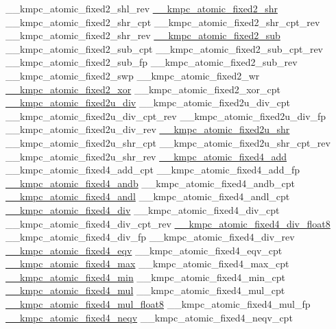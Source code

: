 \begin{DoxyCode}
\_\_kmpc\_atomic\_fixed2\_shl\_rev
\hyperlink{kmp__atomic_8h_a2f1085184a229e72ad013d9c30aa0ce7}{\_\_kmpc\_atomic\_fixed2\_shr}
\_\_kmpc\_atomic\_fixed2\_shr\_cpt
\_\_kmpc\_atomic\_fixed2\_shr\_cpt\_rev
\_\_kmpc\_atomic\_fixed2\_shr\_rev
\hyperlink{kmp__atomic_8h_ac890aceacafc0bc0fd673d5107fe5226}{\_\_kmpc\_atomic\_fixed2\_sub}
\_\_kmpc\_atomic\_fixed2\_sub\_cpt
\_\_kmpc\_atomic\_fixed2\_sub\_cpt\_rev
\_\_kmpc\_atomic\_fixed2\_sub\_fp
\_\_kmpc\_atomic\_fixed2\_sub\_rev
\_\_kmpc\_atomic\_fixed2\_swp
\_\_kmpc\_atomic\_fixed2\_wr
\hyperlink{kmp__atomic_8h_ae5aaefafa4c78317b55ab12e1493ea63}{\_\_kmpc\_atomic\_fixed2\_xor}
\_\_kmpc\_atomic\_fixed2\_xor\_cpt
\hyperlink{kmp__atomic_8h_aee13e51d32f819381cbba00c3b26b607}{\_\_kmpc\_atomic\_fixed2u\_div}
\_\_kmpc\_atomic\_fixed2u\_div\_cpt
\_\_kmpc\_atomic\_fixed2u\_div\_cpt\_rev
\_\_kmpc\_atomic\_fixed2u\_div\_fp
\_\_kmpc\_atomic\_fixed2u\_div\_rev
\hyperlink{kmp__atomic_8h_ad984775f5efdce37aac6fa29c25ae4c1}{\_\_kmpc\_atomic\_fixed2u\_shr}
\_\_kmpc\_atomic\_fixed2u\_shr\_cpt
\_\_kmpc\_atomic\_fixed2u\_shr\_cpt\_rev
\_\_kmpc\_atomic\_fixed2u\_shr\_rev
\hyperlink{kmp__atomic_8h_af3d1bb6747eb9ae36458f5aee2b41d17}{\_\_kmpc\_atomic\_fixed4\_add}
\_\_kmpc\_atomic\_fixed4\_add\_cpt
\_\_kmpc\_atomic\_fixed4\_add\_fp
\hyperlink{kmp__atomic_8h_a2b0ca2e58dd7582202438dd90cae9056}{\_\_kmpc\_atomic\_fixed4\_andb}
\_\_kmpc\_atomic\_fixed4\_andb\_cpt
\hyperlink{kmp__atomic_8h_a14731c60b5778b62db6a852f1ebb2a6a}{\_\_kmpc\_atomic\_fixed4\_andl}
\_\_kmpc\_atomic\_fixed4\_andl\_cpt
\hyperlink{kmp__atomic_8h_aa79d19da90b26da64f6ee2753816c6f7}{\_\_kmpc\_atomic\_fixed4\_div}
\_\_kmpc\_atomic\_fixed4\_div\_cpt
\_\_kmpc\_atomic\_fixed4\_div\_cpt\_rev
\hyperlink{kmp__atomic_8h_a8c0c50f04317dcb0334f598e2e5a5468}{\_\_kmpc\_atomic\_fixed4\_div\_float8}
\_\_kmpc\_atomic\_fixed4\_div\_fp
\_\_kmpc\_atomic\_fixed4\_div\_rev
\hyperlink{kmp__atomic_8h_a0e6bf41dcfa99396fef9df16b3dbeb0e}{\_\_kmpc\_atomic\_fixed4\_eqv}
\_\_kmpc\_atomic\_fixed4\_eqv\_cpt
\hyperlink{kmp__atomic_8h_a30a769d5b309a9ac57db52b90fa35aa1}{\_\_kmpc\_atomic\_fixed4\_max}
\_\_kmpc\_atomic\_fixed4\_max\_cpt
\hyperlink{kmp__atomic_8h_a94966285e25b05a35096394b1f59ce01}{\_\_kmpc\_atomic\_fixed4\_min}
\_\_kmpc\_atomic\_fixed4\_min\_cpt
\hyperlink{kmp__atomic_8h_a3f90f415a8f9969747412d8fb2f58bd2}{\_\_kmpc\_atomic\_fixed4\_mul}
\_\_kmpc\_atomic\_fixed4\_mul\_cpt
\hyperlink{kmp__atomic_8h_ac39427607cd7b0954c284101bee94caa}{\_\_kmpc\_atomic\_fixed4\_mul\_float8}
\_\_kmpc\_atomic\_fixed4\_mul\_fp
\hyperlink{kmp__atomic_8h_a5f2288f05f2dac7bc06820cede332834}{\_\_kmpc\_atomic\_fixed4\_neqv}
\_\_kmpc\_atomic\_fixed4\_neqv\_cpt

\end{DoxyCode}
